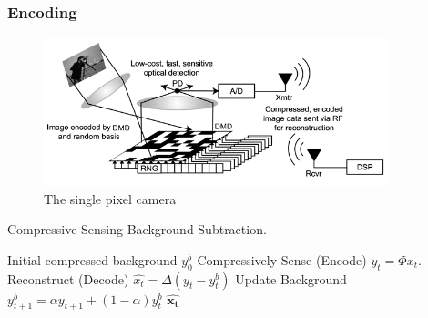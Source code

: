 \documentclass[xcolor=dvipsnames,10pt]{beamer}
\begin{document}
 \begin{frame}
   \frametitle{Encoding}
   \begin{figure}[h]
     \centering
     \includegraphics[width = 10cm]{spc}
     \caption{The single pixel camera}
   \end{figure}
    \end{frame}

      

      \begin{frame}{Compressive Sensing Background Subtraction.}

\begin{algorithm}[H]
\begin{algorithmic}
\REQUIRE Initial compressed background $y^b_0$
\STATE Compressively Sense (Encode) $y_t = \Phi x_t$.
\STATE Reconstruct (Decode)   $\hat{x_t} = \Delta (y_t - y^b_t)$
\STATE Update Background  $y^b_{t+1} = \alpha y_{t+1} + (1 - \alpha)y^b_t$
\RETURN  $\boldsymbol{\hat{x_t}}$
\ENDFOR

\end{algorithmic}
\end{algorithm}
\end{frame}
\end{document}
